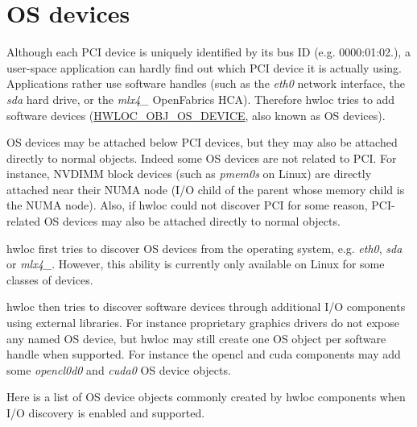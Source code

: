  \hypertarget{a00384_iodevices_osdev}{}\section{O\+S devices}\label{a00384_iodevices_osdev}
Although each P\+CI device is uniquely identified by its bus ID (e.\+g. 0000\+:01\+:02.), a user-\/space application can hardly find out which P\+CI device it is actually using. Applications rather use software handles (such as the {\itshape eth0} network interface, the {\itshape sda} hard drive, or the {\itshape mlx4\+\_} Open\+Fabrics H\+CA). Therefore hwloc tries to add software devices ({\ttfamily \hyperlink{a00184_ggacd37bb612667dc437d66bfb175a8dc55a51e7280240fd9f25589cbbe538bdb075}{H\+W\+L\+O\+C\+\_\+\+O\+B\+J\+\_\+\+O\+S\+\_\+\+D\+E\+V\+I\+CE}}, also known as OS devices).

OS devices may be attached below P\+CI devices, but they may also be attached directly to normal objects. Indeed some OS devices are not related to P\+CI. For instance, N\+V\+D\+I\+MM block devices (such as {\itshape pmem0s} on Linux) are directly attached near their N\+U\+MA node (I/O child of the parent whose memory child is the N\+U\+MA node). Also, if hwloc could not discover P\+CI for some reason, P\+C\+I-\/related OS devices may also be attached directly to normal objects.

hwloc first tries to discover OS devices from the operating system, e.\+g. {\itshape eth0}, {\itshape sda} or {\itshape mlx4\+\_}. However, this ability is currently only available on Linux for some classes of devices.

hwloc then tries to discover software devices through additional I/O components using external libraries. For instance proprietary graphics drivers do not expose any named OS device, but hwloc may still create one OS object per software handle when supported. For instance the {\ttfamily opencl} and {\ttfamily cuda} components may add some {\itshape opencl0d0} and {\itshape cuda0} OS device objects.

Here is a list of OS device objects commonly created by hwloc components when I/O discovery is enabled and supported.


